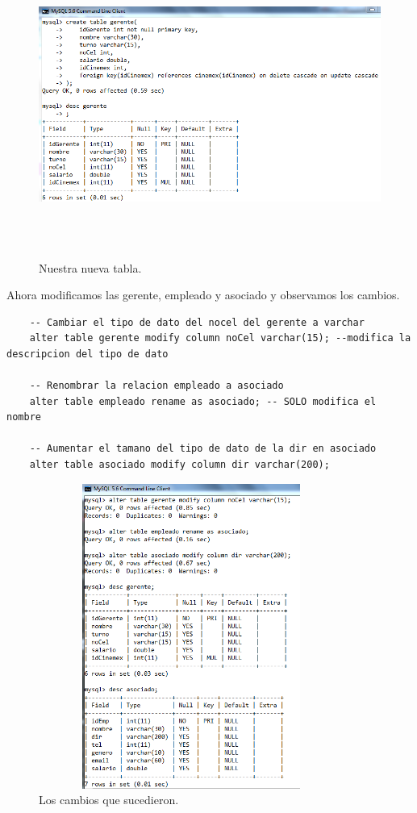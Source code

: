 \documentclass[12pt, titlepage]{article}
\begin{document}
    \begin{figure}[H]
        \begin{center}
            \includegraphics[width=14cm, height=10cm]{img/tabla-gerente.png}
            \caption{Nuestra nueva tabla.}
            \label{fig:tabla-gerente}
        \end{center}
    \end{figure}
    Ahora modificamos las gerente, empleado y asociado y observamos los cambios.
    \begin{lstlisting}
    -- Cambiar el tipo de dato del nocel del gerente a varchar
    alter table gerente modify column noCel varchar(15); --modifica la descripcion del tipo de dato
    
    -- Renombrar la relacion empleado a asociado
    alter table empleado rename as asociado; -- SOLO modifica el nombre
    
    -- Aumentar el tamano del tipo de dato de la dir en asociado
    alter table asociado modify column dir varchar(200); 
    \end{lstlisting}
    \begin{figure}[H]
        \begin{center}
            \includegraphics[width=10cm, height=10cm]{img/mas-alter.png}
            \caption{Los cambios que sucedieron.}
            \label{fig:alter2}
        \end{center}
    \end{figure}
\end{document}
